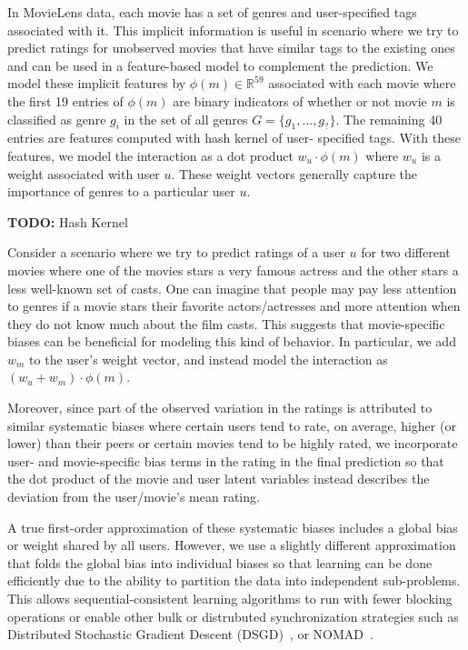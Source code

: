 \documentclass{article} %
\begin{document}
	In MovieLens data, each movie
	has a set of genres and user-specified tags associated with it. This
	implicit information is useful in scenario where we try to predict ratings
	for unobserved movies that have similar tags to the existing ones and can be
	used in a feature-based model to complement the prediction. We model these
	implicit features by $\phi(m) \in \mathbb{R}^{59}$ associated with each
	movie where the first 19 entries of $\phi(m)$ are binary indicators of
	whether or not movie $m$ is classified as genre $g_i$ in the set of all
	genres $G = \{g_1,\ldots, g_?\}$. The remaining 40 entries are features
	computed with hash kernel of user- specified tags. With these features, we
	model the interaction as a dot product $w_u \cdot \phi(m)$ where $w_u$ is a
	weight associated with user $u$. These weight vectors generally capture the
	importance of genres to a particular user $u$.



	\textbf{TODO:} Hash Kernel

	Consider a scenario where we try to predict ratings of a user $u$ for two
	different movies where one of the movies stars a very famous actress and the
	other stars a less well-known set of casts. One can imagine that people may
	pay less attention to genres if a movie stars their favorite
	actors/actresses and more attention when they do not know much about the
	film casts. This suggests that movie-specific biases can be beneficial for
	modeling this kind of behavior. In particular, we add $w_m$ to the user's
	weight vector, and instead model the interaction as $(w_u + w_m) \cdot
	\phi(m)$.

	Moreover, since part of the observed variation in the ratings is attributed
	to similar systematic biases \cite{koren:matrix} where certain users tend to
	rate, on average, higher (or lower) than their peers or certain movies tend
	to be highly rated, we incorporate user- and movie-specific bias terms in
	the rating in the final prediction so that the dot product of the movie and
	user latent variables instead describes the deviation from the user/movie's
	mean rating.

	A true first-order approximation of these systematic biases includes a
	global bias or weight shared by all users. However, we use a slightly
	different approximation that folds the global bias into individual biases so
	that learning can be done efficiently due to the ability to  partition the
	data into independent sub-problems. This allows sequential-consistent
	learning algorithms to run with fewer blocking operations or enable other
	bulk or distrubuted synchronization strategies such as Distributed
	Stochastic Gradient Descent (DSGD)~\cite{gemulla2011large}, or
	NOMAD~\cite{yun2013nomad}.
\end{document}
